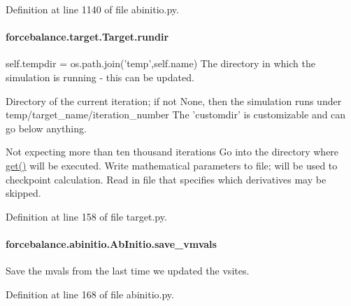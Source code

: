 Definition at line 1140 of file abinitio.\-py.

\hypertarget{classforcebalance_1_1target_1_1Target_a6872de5b2d4273b82336ea5b0da29c9e}{
\paragraph[{rundir}]{\setlength{\rightskip}{0pt plus 5cm}forcebalance.\-target.\-Target.\-rundir\hspace{0.3cm}{\ttfamily [inherited]}}}\label{classforcebalance_1_1target_1_1Target_a6872de5b2d4273b82336ea5b0da29c9e}


self.\-tempdir = os.\-path.\-join('temp',self.\-name) The directory in which the simulation is running -\/ this can be updated. 

Directory of the current iteration; if not None, then the simulation runs under temp/target\-\_\-name/iteration\-\_\-number The 'customdir' is customizable and can go below anything.

Not expecting more than ten thousand iterations Go into the directory where \hyperlink{classforcebalance_1_1target_1_1Target_a1389888302c49d529716cb45b13a6f5a}{get()} will be executed. Write mathematical parameters to file; will be used to checkpoint calculation. Read in file that specifies which derivatives may be skipped. 

Definition at line 158 of file target.\-py.

\hypertarget{classforcebalance_1_1abinitio_1_1AbInitio_a22037bf43728fa45f387390005e0b131}{
\paragraph[{save\-\_\-vmvals}]{\setlength{\rightskip}{0pt plus 5cm}forcebalance.\-abinitio.\-Ab\-Initio.\-save\-\_\-vmvals}}\label{classforcebalance_1_1abinitio_1_1AbInitio_a22037bf43728fa45f387390005e0b131}


Save the mvals from the last time we updated the vsites. 



Definition at line 168 of file abinitio.\-py.

